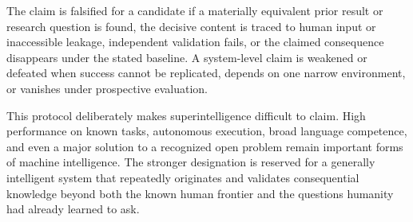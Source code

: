 The claim is falsified for a candidate if a materially equivalent prior result
or research question is found, the decisive content is traced to human input
or inaccessible leakage, independent validation fails, or the claimed
consequence disappears under the stated baseline. A system-level claim is
weakened or defeated when success cannot be replicated, depends on one narrow
environment, or vanishes under prospective evaluation.

This protocol deliberately makes superintelligence difficult to claim. High
performance on known tasks, autonomous execution, broad language competence,
and even a major solution to a recognized open problem remain important forms
of machine intelligence. The stronger designation is reserved for a generally
intelligent system that repeatedly originates and validates consequential
knowledge beyond both the known human frontier and the questions humanity had
already learned to ask.
